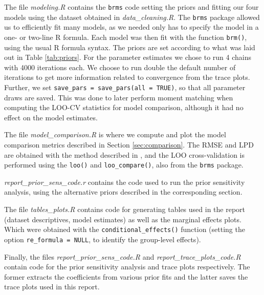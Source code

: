 \documentclass[12pt]{article}
\newcommand{\red}[1]{\textcolor{red}{#1}}
\newcommand{\blue}[1]{\textcolor{blue}{#1}}
\begin{document}
The file \textit{modeling.R} contains the \verb|brms| code setting the priors and fitting our four models using the dataset obtained in \textit{data\_cleaning.R}.
The \verb|brms| package allowed us to efficiently fit many models, as we needed only has to specify the model in a one- or two-line R formula. Each model was then fit with the function \verb|brm()|, using the usual R formula syntax. 
The priors are set according to what was laid out in Table \ref{tab:priors}.
For the parameter estimates we chose to run 4 chains with 4000 iterations each. We choose to run double the default number of iterations to get more information related to convergence from the trace plots. Further, we set \texttt{save\_pars = save\_pars(all = TRUE)}, so that all parameter draws are saved. This was done to later perform moment matching when computing the LOO-CV statistics for model comparison, although it had no effect on the model estimates.

The file \textit{model\_comparison.R} is where we compute and plot the model comparison metrics described in Section \ref{sec:comparison}. The RMSE and LPD are obtained with the method described in \cite{brmsbook}, and the LOO cross-validation is performed using the \verb|loo()| and \verb|loo_compare()|, also from the \verb|brms| package.

\textit{report\_prior\_sens\_code.r} contains the code used to run the prior sensitivity analysis, using the alternative priors described in the corresponding section.

The file \textit{tables\_plots.R} contains code for generating tables used in the report (dataset descriptives, model estimates) as well as the marginal effects plots. Which were obtained with the \verb|conditional_effects()| function (setting the option \texttt{re\_formula = NULL}, to identify the group-level effects).

Finally, the files \textit{report\_prior\_sens\_code.R} and \textit{report\_trace\_plots\_code.R} contain code for the prior sensitivity analysis and trace plots respectively. The former extracts the coefficients from various prior fits and the latter saves the trace plots used in this report.


\end{document}
